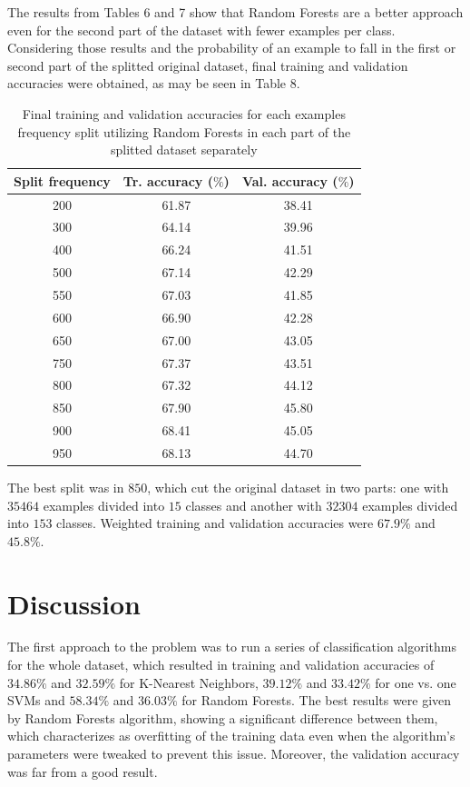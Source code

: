 \documentclass[10pt,twocolumn,letterpaper]{article}
\begin{document}
The results from Tables 6 and 7 show that Random Forests are a better approach even for the second part of the dataset with fewer examples per class. Considering those results and the probability of an example to fall in the first or second part of the splitted original dataset, final training and validation accuracies were obtained, as may be seen in Table 8. 

\begin{table}[h!]
  \begin{center}
    \label{tab:final_accs_splitted}
    \begin{tabular}{c|c|c} %
      \textbf{Split frequency} & \textbf{Tr. accuracy ($\%$)} & \textbf{Val. accuracy ($\%$)}\\
      \hline
      200 & 61.87 & 38.41\\
      300 & 64.14 & 39.96\\
      400 & 66.24 & 41.51\\
      500 & 67.14 & 42.29\\
      550 & 67.03 & 41.85\\
      600 & 66.90 & 42.28\\
      650 & 67.00 & 43.05\\
      750 & 67.37 & 43.51\\
      800 & 67.32 & 44.12\\
      850 & 67.90 & 45.80\\
      900 & 68.41 & 45.05\\
      950 & 68.13 & 44.70\\
    \end{tabular}
    \caption{Final training and validation accuracies for each examples frequency split utilizing Random Forests in each part of the splitted dataset separately}
  \end{center}
\end{table}

The best split was in $850$, which cut the original dataset in two parts: one with $35464$ examples divided into $15$ classes and another with $32304$ examples divided into $153$ classes. Weighted training and validation accuracies were $67.9\%$ and $45.8\%$.

\section{Discussion}

The first approach to the problem was to run a series of classification algorithms for the whole dataset, which resulted in training and validation accuracies of $34.86\%$  and $32.59\%$ for K-Nearest Neighbors, $39.12\%$ and $33.42\%$ for one vs. one SVMs and  $58.34\%$ and $36.03\%$ for Random Forests. The best results were given by Random Forests algorithm, showing a significant difference between them, which characterizes as overfitting of the training data even when the algorithm's parameters were tweaked to prevent this issue. Moreover, the validation accuracy was far from a good result.
\end{document}
